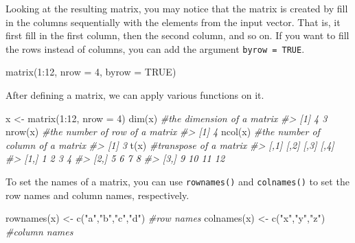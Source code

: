 \documentclass[
]{book}
\newenvironment{Shaded}{\begin{snugshade}}{\end{snugshade}}
\newcommand{\AttributeTok}[1]{\textcolor[rgb]{0.77,0.63,0.00}{#1}}
\newcommand{\CommentTok}[1]{\textcolor[rgb]{0.56,0.35,0.01}{\textit{#1}}}
\newcommand{\ConstantTok}[1]{\textcolor[rgb]{0.00,0.00,0.00}{#1}}
\newcommand{\DecValTok}[1]{\textcolor[rgb]{0.00,0.00,0.81}{#1}}
\newcommand{\FunctionTok}[1]{\textcolor[rgb]{0.00,0.00,0.00}{#1}}
\newcommand{\NormalTok}[1]{#1}
\newcommand{\OtherTok}[1]{\textcolor[rgb]{0.56,0.35,0.01}{#1}}
\newcommand{\SpecialCharTok}[1]{\textcolor[rgb]{0.00,0.00,0.00}{#1}}
\newcommand{\StringTok}[1]{\textcolor[rgb]{0.31,0.60,0.02}{#1}}
\begin{document}
Looking at the resulting matrix, you may notice that the matrix is created by fill in the columns sequentially with the elements from the input vector. That is, it first fill in the first column, then the second column, and so on. If you want to fill the rows instead of columns, you can add the argument \texttt{byrow\ =\ TRUE}.

\begin{Shaded}
\begin{Highlighting}[]
\FunctionTok{matrix}\NormalTok{(}\DecValTok{1}\SpecialCharTok{:}\DecValTok{12}\NormalTok{, }\AttributeTok{nrow =} \DecValTok{4}\NormalTok{, }\AttributeTok{byrow =} \ConstantTok{TRUE}\NormalTok{)}
\end{Highlighting}
\end{Shaded}

After defining a matrix, we can apply various functions on it.

\begin{Shaded}
\begin{Highlighting}[]
\NormalTok{x }\OtherTok{\textless{}{-}} \FunctionTok{matrix}\NormalTok{(}\DecValTok{1}\SpecialCharTok{:}\DecValTok{12}\NormalTok{, }\AttributeTok{nrow =} \DecValTok{4}\NormalTok{)}
\FunctionTok{dim}\NormalTok{(x)            }\CommentTok{\#the dimension of a matrix         }
\CommentTok{\#\textgreater{} [1] 4 3}
\FunctionTok{nrow}\NormalTok{(x)           }\CommentTok{\#the number of row of a matrix }
\CommentTok{\#\textgreater{} [1] 4}
\FunctionTok{ncol}\NormalTok{(x)           }\CommentTok{\#the number of column of a matrix }
\CommentTok{\#\textgreater{} [1] 3}
\FunctionTok{t}\NormalTok{(x)              }\CommentTok{\#transpose of a matrix}
\CommentTok{\#\textgreater{}      [,1] [,2] [,3] [,4]}
\CommentTok{\#\textgreater{} [1,]    1    2    3    4}
\CommentTok{\#\textgreater{} [2,]    5    6    7    8}
\CommentTok{\#\textgreater{} [3,]    9   10   11   12}
\end{Highlighting}
\end{Shaded}

To set the names of a matrix, you can use \texttt{rownames()} and \texttt{colnames()} to set the row names and column names, respectively.

\begin{Shaded}
\begin{Highlighting}[]
\FunctionTok{rownames}\NormalTok{(x) }\OtherTok{\textless{}{-}} \FunctionTok{c}\NormalTok{(}\StringTok{"a"}\NormalTok{,}\StringTok{"b"}\NormalTok{,}\StringTok{"c"}\NormalTok{,}\StringTok{"d"}\NormalTok{)     }\CommentTok{\#row names}
\FunctionTok{colnames}\NormalTok{(x) }\OtherTok{\textless{}{-}} \FunctionTok{c}\NormalTok{(}\StringTok{"x"}\NormalTok{,}\StringTok{"y"}\NormalTok{,}\StringTok{"z"}\NormalTok{)         }\CommentTok{\#column names}
\end{Highlighting}
\end{Shaded}
\end{document}
